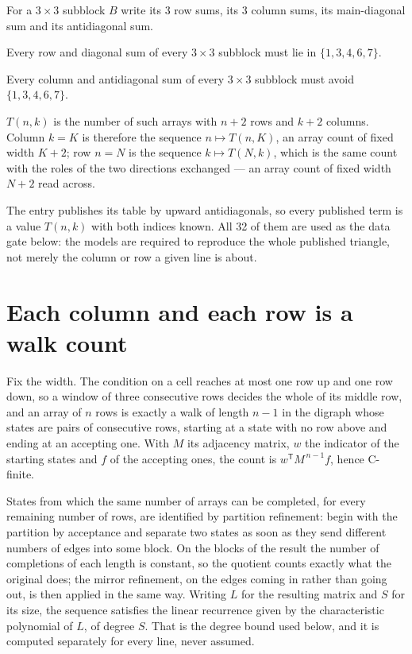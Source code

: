 \documentclass[11pt]{article}
\theoremstyle{definition}
\begin{document}
For a $3\times3$ subblock $B$ write its 3 row sums, its 3 column sums, its main-diagonal sum and its antidiagonal sum.

Every row and diagonal sum of every $3\times3$ subblock must lie in $\{1, 3, 4, 6, 7\}$.

Every column and antidiagonal sum of every $3\times3$ subblock must avoid $\{1, 3, 4, 6, 7\}$.

$T(n,k)$ is the number of such arrays with $n + 2$ rows and $k + 2$ columns. Column $k = K$ is therefore the sequence $n \mapsto T(n,K)$, an array count of fixed width $K + 2$; row $n = N$ is the sequence $k \mapsto T(N,k)$, which is the same count with the roles of the two directions exchanged --- an array count of fixed width $N + 2$ read across.

The entry publishes its table by upward antidiagonals, so every published term is a value $T(n,k)$ with both indices known. All 32 of them are used as the data gate below: the models are required to reproduce the whole published triangle, not merely the column or row a given line is about.

\section{Each column and each row is a walk count}

Fix the width. The condition on a cell reaches at most one row up and one row down, so a window of three consecutive rows decides the whole of its middle row, and an array of $n$ rows is exactly a walk of length $n-1$ in the digraph whose states are pairs of consecutive rows, starting at a state with no row above and ending at an accepting one. With $M$ its adjacency matrix, $w$ the indicator of the starting states and $f$ of the accepting ones, the count is $w^{\mathsf T}M^{\,n-1}f$, hence C-finite.

States from which the same number of arrays can be completed, for every remaining number of rows, are identified by partition refinement: begin with the partition by acceptance and separate two states as soon as they send different numbers of edges into some block. On the blocks of the result the number of completions of each length is constant, so the quotient counts exactly what the original does; the mirror refinement, on the edges coming in rather than going out, is then applied in the same way. Writing $L$ for the resulting matrix and $S$ for its size, the sequence satisfies the linear recurrence given by the characteristic polynomial of $L$, of degree $S$. That is the degree bound used below, and it is computed separately for every line, never assumed.
\end{document}
